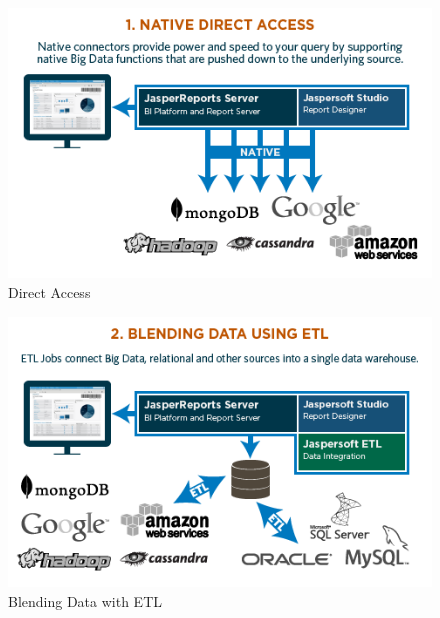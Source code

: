 \begin{figure}[!ht]
        \centering\includegraphics[width=\columnwidth]{../images/native-direct-access.png}
        \caption{Direct Access~\cite{hid-sp18-516-www-jaspersoft-big-data}}
        \label{fig:native-direct-access}
\end{figure}

\begin{figure}[!ht]
        \centering\includegraphics[width=\columnwidth]{../images/blending-with-etl.png}
        \caption{Blending Data with ETL~\cite{hid-sp18-516-www-jaspersoft-big-data}}
        \label{fig:blending-with-etl}
\end{figure}

